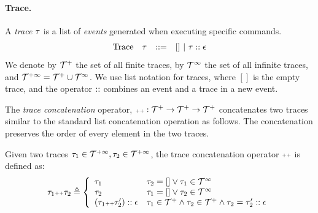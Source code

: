 \paragraph{Trace.}
 A \emph{trace}
 $\mathtt{\tau}$ is a list of \emph{events} generated when executing specific commands. 
 \[
 \begin{array}{llll}
 \mbox{Trace} & \mathtt{\tau}
 & ::= & [] ~|~ \mathtt{\tau} :: \mathtt{\epsilon}
 \end{array}
 \]
 We denote by $\mathcal{T}^{+}$ the set of all finite traces, by $\mathcal{T}^{\infty} $ the set of all infinite traces, and $\mathcal{T}^{+\infty} = \mathcal{T}^{+} \cup \mathcal{T}^{\infty}$. 
 We use list notation for traces, where $[]$ is the empty trace, and the operator ${\small ::}$ combines an event and a trace in a new event. 

The \emph{trace concatenation} operator, ${\scriptscriptstyle ++}: \mathcal{T}^{+} \to \mathcal{T}^{+} \to \mathcal{T}^{+}$ concatenates two traces
similar to the standard list concatenation operation as follows.
The concatenation preserves the order of every element in the two traces.

 \begin{defn}
 \label{def:trace_cat}
 Given two traces $\mathtt{\tau}_1 \in \mathcal{T}^{+\infty}, \mathtt{\tau}_2 \in \mathcal{T}^{+\infty}$, the trace concatenation operator 
 ${\scriptscriptstyle ++}$ is defined as:
 \[
 \trace_1 \tracecat \trace_2 \triangleq
 \left\{
 \begin{array}{ll} 
 \trace_1 & \trace_2 = [] \lor \trace_1 \in \inftdom \\
 \trace_2 & \trace_1 = [] \lor \trace_2 \in \inftdom \\
 (\trace_1 \tracecat \trace_2'):: \event & \trace_1 \in \ftdom \land \trace_2 \in \ftdom \land \trace_2 = \trace_2' :: \event
 \end{array}
 \right.
 \]
 \end{defn}

